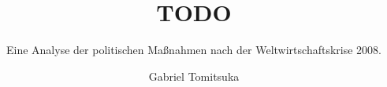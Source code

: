 \documentclass[a4paper,draft]{report}
\begin{document}
\title{TODO}
\subtitle{Eine Analyse der politischen Maßnahmen nach der Weltwirtschaftskrise 2008.}
\author{Gabriel Tomitsuka}
\maketitle
\tableofcontents
\end{document}
